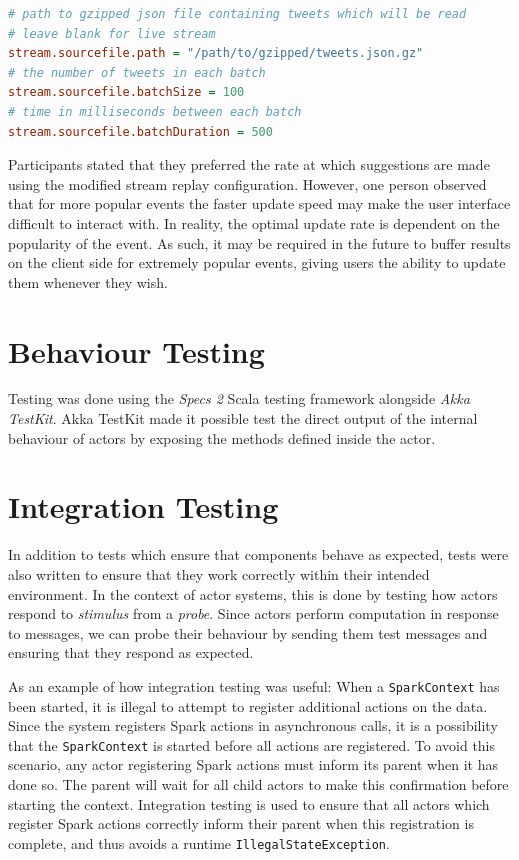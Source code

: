 \documentclass{l4proj}
\newcommand{\code}[1]{\texttt{#1}}
\begin{document}
\begin{lstlisting}[caption=Configuration of the stream replay rate in application.conf,language=Ini]
# path to gzipped json file containing tweets which will be read
# leave blank for live stream
stream.sourcefile.path = "/path/to/gzipped/tweets.json.gz"
# the number of tweets in each batch
stream.sourcefile.batchSize = 100
# time in milliseconds between each batch
stream.sourcefile.batchDuration = 500
\end{lstlisting}

Participants stated that they preferred the rate at which suggestions are made using the modified stream replay configuration. However, one person observed that for more popular events the faster update speed may make the user interface difficult to interact with. In reality, the optimal update rate is dependent on the popularity of the event. As such, it may be required in the future to buffer results on the client side for extremely popular events, giving users the ability to update them whenever they wish.

\section{Behaviour Testing}

    Testing was done using the \textit{Specs 2} Scala testing framework alongside \textit{Akka TestKit}. Akka TestKit made it possible test the direct output of the internal behaviour of actors by exposing the methods defined inside the actor.
        
\section{Integration Testing}
    In addition to tests which ensure that components behave as expected, tests were also written to ensure that they work correctly within their intended environment. In the context of actor systems, this is done by testing how actors respond to \textit{stimulus} from a \textit{probe}. Since actors perform computation in response to messages, we can probe their behaviour by sending them test messages and ensuring that they respond as expected.
    
    As an example of how integration testing was useful: When a \code{SparkContext} has been started, it is illegal to attempt to register additional actions on the data. Since the system registers Spark actions in asynchronous calls, it is a possibility that the \code{SparkContext} is started before all actions are registered. To avoid this scenario, any actor registering Spark actions must inform its parent when it has done so. The parent will wait for all child actors to make this confirmation before starting the context. Integration testing is used to ensure that all actors which register Spark actions correctly inform their parent when this registration is complete, and thus avoids a runtime \code{IllegalStateException}.   
\end{document}
